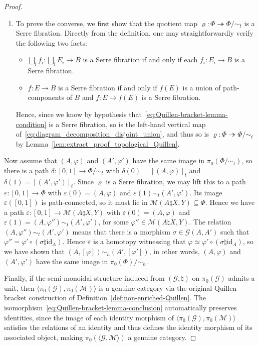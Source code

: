 \documentclass[AHL,Unicode,published]{cedram}
\newcommand{\id}{\mathrm{id}}
\newcommand{\cG}{\mathcal{G}}
\newcommand{\cM}{\mathcal{M}}
\newcommand{\too}{\ensuremath{\longrightarrow}}
\begin{document}
\begin{proof}
\begin{enumerate}
\item To prove the converse, we first show that the quotient map $\varrho \colon \Phi \twoheadrightarrow \Phi / {\sim_{t}}$ is a Serre fibration. Directly from the definition, one may straightforwardly verify the following two facts:
\begin{itemize}
\item $\bigsqcup_{i} f_{i} \colon \bigsqcup_{i} E_{i} \to B$ is a Serre fibration if and only if each $f_{i} \colon E_{i} \to B$ is a Serre fibration.
\item $f \colon E \to B$ is a Serre fibration if and only if $f(E)$ is a union of path-components of $B$ and $f \colon E \to f(E)$ is a Serre fibration.
\end{itemize}
Hence, since we know by hypothesis that~\eqref{eq:Quillen-bracket-lemma-condition} is a Serre fibration, so is the left-hand vertical map of~\eqref{eq:diagram_decomposition_disjoint_union}, and thus so is $\varrho \colon \Phi \twoheadrightarrow \Phi / {\sim_{t}}$ by Lemma~\ref{lem:extract_proof_topological_Quillen}.
\end{enumerate}

Now assume that $(A,\varphi)$ and $(A',\varphi')$ have the same image in $\pi_{0}(\Phi/{\sim_{t}})$, so there is a path $\delta \colon [0,1] \to \Phi/{\sim_{t}}$ with $\delta(0) = [(A,\varphi)]_t$ and $\delta(1) = [(A',\varphi')]_t$. Since $\varrho$ is a Serre fibration, we may lift this to a path $\varepsilon \colon [0,1] \to \Phi$ with $\varepsilon(0) = (A,\varphi)$ and $\varepsilon(1) \sim_{t} (A',\varphi')$. Its image $\varepsilon([0,1])$ is path-connected, so it must lie in $\cM(A\natural X,Y) \subseteq \Phi$. Hence we have a path $\varepsilon \colon [0,1] \too \cM(A\natural X,Y)$ with $\varepsilon(0) = (A,\varphi)$ and $\varepsilon(1) = (A,\varphi'') \sim_{t} (A',\varphi')$, for some $\varphi'' \in \cM(A\natural X,Y)$. The relation $(A,\varphi'') \sim_{t} (A',\varphi')$ means that there is a morphism $\sigma \in \cG(A,A')$ such that $\varphi'' = \varphi' \circ (\sigma\natural\id_{A})$. Hence $\varepsilon$ is a homotopy witnessing that $\varphi \simeq \varphi' \circ (\sigma\natural\id_{A})$, so we have shown that $(A,[\varphi]) \sim_h (A',[\varphi'])$, in other words, $(A,\varphi)$ and $(A',\varphi')$ have the same image in $\pi_{0}(\Phi)/{\sim_h}$.

Finally, if the semi-monoidal structure induced from $(\cG,\natural)$ on $\pi_{0}(\cG)$ admits a unit, then $\langle \pi_{0}(\cG),\pi_{0}(\cM) \rangle$ is a genuine category via the original Quillen bracket construction of Definition~\ref{def:non-enriched-Quillen}. The isomorphism~\eqref{eq:Quillen-bracket-lemma-conclusion} automatically preserves identities, since the image of each identity morphism of $\langle \pi_{0}(\cG),\pi_{0}(\cM) \rangle$ satisfies the relations of an identity and thus defines the identity morphism of its associated object, making $\pi_{0}(\langle \cG,\cM \rangle)$ a genuine category.
\end{proof}
\end{document}
